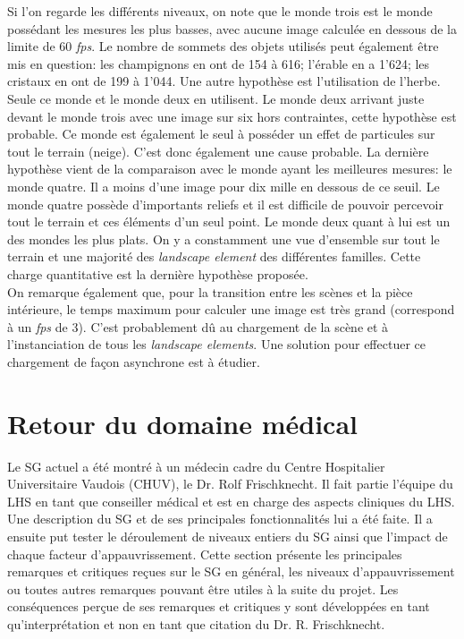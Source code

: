 	Si l'on regarde les différents niveaux, on note que le monde trois est le monde possédant les mesures les plus basses, avec aucune image calculée en dessous de la limite de 60 \textit{fps}. 
	Le nombre de sommets des objets utilisés peut également être mis en question: les champignons en ont de 154 à 616; l'érable en a 1'624; les cristaux en ont de 199 à 1'044. Une autre hypothèse est l'utilisation de l'herbe. Seule ce monde et le monde deux en utilisent. Le monde deux arrivant juste devant le monde trois avec une image sur six hors contraintes, cette hypothèse est probable. Ce monde est également le seul à posséder un effet de particules sur tout le terrain (neige). C'est donc également une cause probable.%
	La dernière hypothèse vient de la comparaison avec le monde ayant les meilleures mesures: le monde quatre. Il a moins d'une image pour dix mille en dessous de ce seuil. Le monde quatre possède d'importants reliefs et il est difficile de pouvoir percevoir tout le terrain et ces éléments d'un seul point. Le monde deux quant à lui est un des mondes les plus plats. On y a constamment une vue d'ensemble sur tout le terrain et une majorité des \textit{landscape element} des différentes familles. Cette charge quantitative est la dernière hypothèse proposée.
	\\
	
	On remarque également que, pour la transition entre les scènes et la pièce intérieure, le temps maximum pour calculer une image est très grand (correspond à un \textit{fps} de 3). C'est probablement dû au chargement de la scène et à l'instanciation de tous les \textit{landscape elements}. Une solution pour effectuer ce chargement de façon asynchrone est à étudier.

\section{Retour du domaine médical}
	\label{sResRetourDomaineMedical}
	Le SG actuel a été montré à un médecin cadre du Centre Hospitalier Universitaire Vaudois (CHUV), le Dr. Rolf Frischknecht. Il fait partie l'équipe du LHS en tant que conseiller médical et est en charge des aspects cliniques du LHS.
	Une description du SG et de ses principales fonctionnalités lui a été faite. Il a ensuite put tester le déroulement de niveaux entiers du SG ainsi que l'impact de chaque facteur d'appauvrissement. Cette section présente les principales remarques et critiques reçues sur le SG en général, les niveaux d'appauvrissement ou toutes autres remarques pouvant être utiles à la suite du projet. Les conséquences perçue de ses remarques et critiques y sont développées en tant qu'interprétation et non en tant que citation du Dr. R. Frischknecht.	
	
